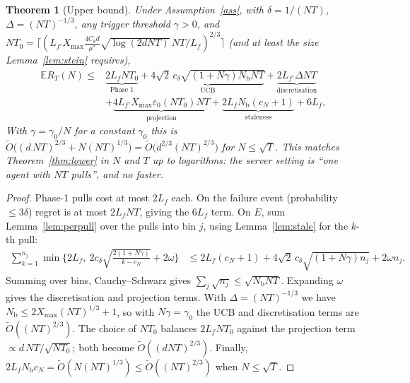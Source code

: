 \documentclass[11pt]{article}
\newtheorem{theorem}{Theorem}
\theoremstyle{definition}
\newcommand{\E}{\mathbb{E}}
\newcommand{\Nb}{N_{\mathrm b}}
\newcommand{\Xmax}{X_{\max}}
\newcommand{\eps}{\varepsilon}
\begin{document}
\begin{theorem}[Upper bound]\label{thm:upper}
Under Assumption~\ref{ass}, with $\delta=1/(NT)$, $\Delta=(NT)^{-1/3}$, any trigger threshold $\gamma>0$, and
$NT_0=\big\lceil(L_{f'}\Xmax\tfrac{4C_\theta d}{\mu^*}\sqrt{\log(2dNT)}\,NT/L_f)^{2/3}\big\rceil$
(and at least the size Lemma~\ref{lem:stein} requires),
\begin{align*}
\E R_T(N)\le{}&
\underbrace{2L_f NT_0}_{\text{Phase 1}}
+\underbrace{4\sqrt2\,c_\delta\sqrt{(1+N\gamma)\Nb NT}}_{\text{UCB}}
+\underbrace{2L_{f'}\Delta NT}_{\text{discretisation}}\\
&+\underbrace{4L_{f'}\Xmax\eps_0(NT_0)NT}_{\text{projection}}
+\underbrace{2L_f\Nb(c_N+1)}_{\text{staleness}}
+6L_f,
\end{align*}
With $\gamma=\gamma_0/N$ for a constant $\gamma_0$ this is
$\tilde O\big((d\,NT)^{2/3}+N(NT)^{1/3}\big)=\tilde O\big(d^{2/3}(NT)^{2/3}\big)$ for
$N\le\sqrt T$. This matches Theorem~\ref{thm:lower} in $N$ and $T$ up to logarithms: the server
setting is ``one agent with $NT$ pulls'', and no faster.
\end{theorem}
\begin{proof}
Phase-1 pulls cost at most $2L_f$ each. On the failure event (probability $\le3\delta$) regret is
at most $2L_fNT$, giving the $6L_f$ term. On $E$, sum Lemma~\ref{lem:perpull} over the pulls into
bin $j$, using Lemma~\ref{lem:stale} for the $k$-th pull:
\begin{align*}
\sum_{k=1}^{n_j}\min\Big\{2L_f,\ 2c_\delta\sqrt{\tfrac{2(1+N\gamma)}{k-c_N}}+2\omega\Big\}
&\le 2L_f(c_N+1)+4\sqrt2\,c_\delta\sqrt{(1+N\gamma)n_j}+2\omega n_j.
\end{align*}
Summing over bins, Cauchy--Schwarz gives $\sum_j\sqrt{n_j}\le\sqrt{\Nb NT}$. Expanding $\omega$
gives the discretisation and projection terms. With $\Delta=(NT)^{-1/3}$ we have
$\Nb\le2\Xmax(NT)^{1/3}+1$, so with $N\gamma=\gamma_0$ the UCB and discretisation terms are
$\tilde O((NT)^{2/3})$. The
choice of $NT_0$ balances $2L_fNT_0$ against the projection term
$\propto d\,NT/\sqrt{NT_0}$; both become $\tilde O((dNT)^{2/3})$. Finally,
$2L_f\Nb c_N=\tilde O(N(NT)^{1/3})\le\tilde O((NT)^{2/3})$ when $N\le\sqrt T$.
\end{proof}
\end{document}

